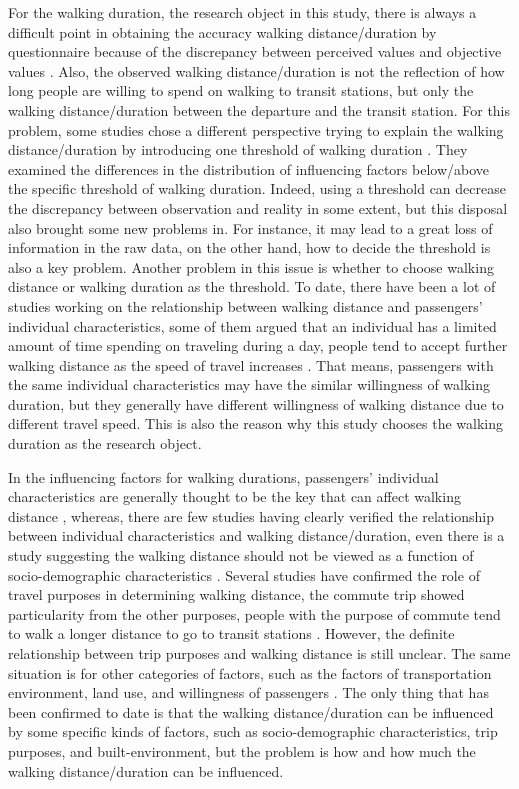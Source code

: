 \documentclass[Journal,letterpaper]{ascelike-new}
\begin{document}
%
For the walking duration, the research object in this study, there is always a difficult point in obtaining the accuracy walking distance/duration by questionnaire because of the discrepancy between perceived values and objective values \cite{BadlandHannahMandSchofieldGrantMandSchluter2007,McCormack2008}. Also, the observed walking distance/duration is not the reflection of how long people are willing to spend on walking to transit stations, but only the walking distance/duration between the departure and the transit station. For this problem, some studies chose a different perspective trying to explain the walking distance/duration by introducing one threshold of walking duration \cite{Besser2005,McCormack2008}. They examined the differences in the distribution of influencing factors below/above the specific threshold of walking duration. Indeed, using a threshold can decrease the discrepancy between observation and reality in some extent, but this disposal also brought some new problems in. For instance, it may lead to a great loss of information in the raw data, on the other hand, how to decide the threshold is also a key problem. Another problem in this issue is whether to choose walking distance or walking duration as the threshold. To date, there have been a lot of studies working on the relationship between walking distance and passengers' individual characteristics, some of them argued that an individual has a limited amount of time spending on traveling during a day, people tend to accept further walking distance as the speed of travel increases \cite{Marchetti1994,Larsen2010}. That means, passengers with the same individual characteristics may have the similar willingness of walking duration, but they generally have different willingness of walking distance due to different travel speed. This is also the reason why this study chooses the walking duration as the research object.

%
In the influencing factors for walking durations, passengers' individual characteristics are generally thought to be the key that can affect walking distance \cite{Besser2005,WeinsteinAgrawal2008,Krygsman2004,Yang2012,Daniels2013,Guerra2012}, whereas, there are few studies having clearly verified the relationship between individual characteristics and walking distance/duration, even there is a study suggesting the walking distance should not be viewed as a function of socio-demographic characteristics \cite{Krygsman2004}. Several studies have confirmed the role of travel purposes in determining walking distance, the commute trip showed particularity from the other purposes, people with the purpose of commute tend to walk a longer distance to go to transit stations \cite{Larsen2010}. However, the definite relationship between trip purposes and walking distance is still unclear. The same situation is for other categories of factors, such as the factors of transportation environment, land use, and willingness of passengers \cite{Guerra2012,Krygsman2004,WeinsteinAgrawal2008}. The only thing that has been confirmed to date is that the walking distance/duration can be influenced by some specific kinds of factors, such as socio-demographic characteristics, trip purposes, and built-environment, but the problem is how and how much the walking distance/duration can be influenced.
\end{document}
